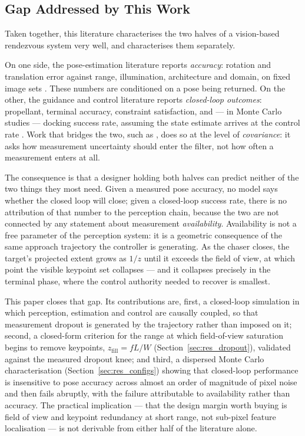\subsection{Gap Addressed by This Work}
\label{sec:gap}

Taken together, this literature characterises the two halves of a vision-based
rendezvous system very well, and characterises them separately.

On one side, the pose-estimation literature reports \emph{accuracy}: rotation
and translation error against range, illumination, architecture and domain, on
fixed image sets
\cite{kisantal2020,park2023spec2021,park2024spnv2,park2026spnv3,cassinis2019review}.
These numbers are conditioned on a pose being returned. On the other, the
guidance and control literature reports \emph{closed-loop outcomes}:
propellant, terminal accuracy, constraint satisfaction, and --- in Monte Carlo
studies --- docking success rate, assuming the state estimate arrives at the
control rate \cite{dicairano2012mpc,breger2008,specht2023tubempc}. Work that
bridges the two, such as \cite{cassinis2021coupled}, does so at the level of
\emph{covariance}: it asks how measurement uncertainty should enter the
filter, not how often a measurement enters at all.

The consequence is that a designer holding both halves can predict neither of
the two things they most need. Given a measured pose accuracy, no model says
whether the closed loop will close; given a closed-loop success rate, there is
no attribution of that number to the perception chain, because the two are not
connected by any statement about measurement \emph{availability}. Availability
is not a free parameter of the perception system: it is a geometric
consequence of the same approach trajectory the controller is generating. As
the chaser closes, the target's projected extent grows as $1/z$ until it
exceeds the field of view, at which point the visible keypoint set collapses
--- and it collapses precisely in the terminal phase, where the control
authority needed to recover is smallest.

This paper closes that gap. Its contributions are, first, a closed-loop
simulation in which perception, estimation and control are causally coupled,
so that measurement dropout is generated by the trajectory rather than imposed
on it; second, a closed-form criterion for the range at which field-of-view
saturation begins to remove keypoints, $z_{\text{fill}} = fL/W$
(Section~\ref{sec:res_dropout}), validated against the measured dropout knee;
and third, a dispersed Monte Carlo characterisation
(Section~\ref{sec:res_configs}) showing that closed-loop performance is
insensitive to pose accuracy across almost an order of magnitude of pixel
noise and then fails abruptly, with the failure attributable to availability
rather than accuracy. The practical implication --- that the design margin
worth buying is field of view and keypoint redundancy at short range, not
sub-pixel feature localisation --- is not derivable from either half of the
literature alone.
